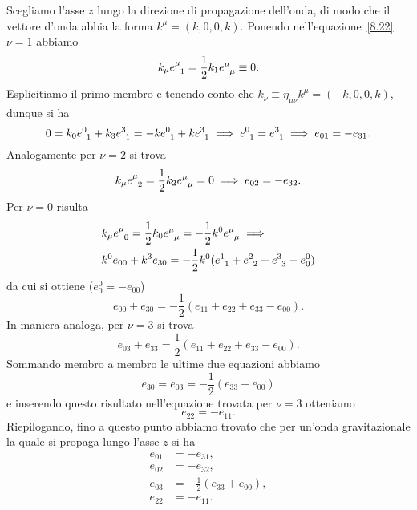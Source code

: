 Scegliamo l'asse $z$ lungo la direzione di propagazione dell'onda, di modo che
il vettore d'onda abbia la forma $k^{\mu} = (k, 0, 0, k)$.  Ponendo
nell'equazione~\eqref{8.22} $\nu = 1$ abbiamo
\begin{equation}
  k_{\mu}\tensor{e}{^{\mu}_{1}} = \frac{1}{2} k_{1}\tensor{e}{^{\mu}_{\mu}}
  \equiv 0.
\end{equation}
Esplicitiamo il primo membro e tenendo conto che $k_{\nu} \equiv \eta_{\mu \nu}
k^{\mu} = (-k, 0, 0, k)$, dunque si ha
\begin{equation}
  0 = k_{0} \tensor{e}{^{0}_{1}} + k_{3} \tensor{e}{^{3}_{1}} = -k
  \tensor{e}{^{0}_{1}} + k \tensor{e}{^{3}_{1}} \implies
  \tensor{e}{^{0}_{1}} = \tensor{e}{^{3}_{1}} \implies e_{01} = -e_{31}.
\end{equation}
Analogamente per $\nu = 2$ si trova
\begin{equation}
  k_{\mu} \tensor{e}{^{\mu}_{2}} = \frac{1}{2} k_{2} \tensor{e}{^{\mu}_{\mu}} =
  0 \implies e_{02} = -e_{32}.
\end{equation}
Per $\nu = 0$ risulta
\begin{equation}
  \begin{split}
    &k_{\mu} \tensor{e}{^{\mu}_{0}} = \frac{1}{2} k_{0}\tensor{e}{^{\mu}_{\mu}}
    = -\frac{1}{2}k^{0}\tensor{e}{^{\mu}_{\mu}} \implies \\
    &k^{0} e_{00} + k^{3}e_{30} = -\frac{1}{2}k^{0}(\tensor{e}{^{1}_{1}} +
    \tensor{e}{^{2}_{2}} + \tensor{e}{^{3}_{3}} - e^0_0)
  \end{split}
\end{equation}
da cui si ottiene ($e^0_0 = - e_{00}$)
\begin{equation}
  e_{00} + e_{30} = -\frac{1}{2}(e_{11} + e_{22} + e_{33} - e_{00}).
\end{equation}
In maniera analoga, per $\nu = 3$ si trova
\begin{equation}
  e_{03} + e_{33} = \frac{1}{2}(e_{11} + e_{22} + e_{33} - e_{00}).
\end{equation}
Sommando membro a membro le ultime due equazioni abbiamo
\begin{equation}
  e_{30}= e_{03} = -\frac{1}{2}(e_{33} + e_{00})
\end{equation}
e inserendo questo risultato nell'equazione trovata per $\nu = 3$ otteniamo
\begin{equation}
  e_{22} = -e_{11}.
\end{equation}
Riepilogando, fino a questo punto abbiamo trovato che per un'onda gravitazionale
la quale si propaga lungo l'asse $z$ si ha
\begin{subequations}
  \begin{align}
    e_{01} &= -e_{31}, \\
    e_{02} &= -e_{32}, \\
    e_{03} &= -\frac{1}{2}(e_{33} + e_{00}), \\
    \label{8.31}
    e_{22} &= -e_{11}.
  \end{align}
\end{subequations}


